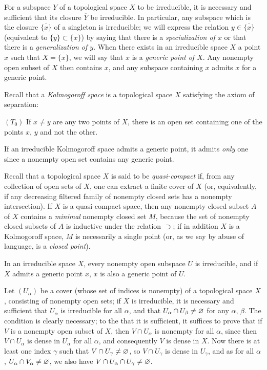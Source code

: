 \begin{env}[2.1.2]
\label{env-0.2.1.2}
For a subspace $Y$ of a topological space $X$ to be irreducible, it is necessary
and sufficient that its closure $\overline{Y}$ be irreducible. In particular,
any subspace which is the closure $\overline{\{x\}}$ of a singleton is
irreducible; we will express the relation $y\in\overline{\{x\}}$ (equivalent to
$\overline{\{y\}}\subset\overline{\{x\}}$) by saying that there is a
{\em specialization of $x$} or that there is a {\em generalization of $y$}.
When there exists in an irreducible space $X$ a point $x$ such that
$X=\overline{\{x\}}$, we will say that $x$ is a {\em generic point of $X$}. Any
nonempty open subset of $X$ then contains $x$, and any subspace containing $x$
admits $x$ for a generic point.
\end{env}

\begin{env}[2.1.3]
\label{env-0.2.1.3}
Recall that a {\em Kolmogoroff space} is a topological space $X$ satisfying the
axiom of separation:

$(T_0)$ If $x\neq y$ are any two points of $X$, there is an open set containing
one of the points $x$, $y$ and not the other.

If an irreducible Kolmogoroff space admits a generic point, it admits
{\em only} one since a nonempty open set contains any generic point.

Recall that a topological space $X$ is said to be {\em quasi-compact} if, from
any collection of open sets of $X$, one can extract a finite cover of $X$ (or,
equivalently, if any decreasing filtered family of nonempty closed sets has a
nonempty intersection). If $X$ is a quasi-compact space, then any nonempty
closed subset $A$ of $X$ contains a {\em minimal} nonempty closed set $M$,
because the set of nonempty closed subsets of $A$ is inductive under the
relation $\supset$; if in addition $X$ is a Kolmogoroff space, $M$ is
necessarily a single point (or, as we say by abuse of language, is a
{\em closed point}).
\end{env}

\begin{env}[2.1.4]
\label{env-0.2.1.4}
In an irreducible space $X$, every nonempty open subspace $U$ is irreducible,
and if $X$ admits a generic point $x$, $x$ is also a generic point of $U$.

Let $(U_\alpha)$ be a cover (whose set of indices is nonempty) of a topological
space $X$, consisting of nonempty open sets; if $X$ is irreducible, it is
necessary and sufficient that $U_\alpha$ is irreducible for all $\alpha$, and
that $U_\alpha\cap U_\beta\neq\varnothing$ for any $\alpha$, $\beta$. The condition is
clearly necessary; to the that it is sufficient, it suffices to prove that if
$V$ is a nonempty open subset of $X$, then $V\cap U_\alpha$ is nonempty for all
$\alpha$, since then $V\cap U_\alpha$ is dense in $U_\alpha$ for all $\alpha$,
and consequently $V$ is dense in $X$. Now there is at least one index $\gamma$
such that $V\cap U_\gamma\neq\varnothing$, so $V\cap U_\gamma$ is dense in $U_\gamma$,
and as for all $\alpha$, $U_\alpha\cap V_\alpha\neq\varnothing$, we also have
$V\cap U_\alpha\cap U_\gamma\neq\varnothing$.
\end{env}

